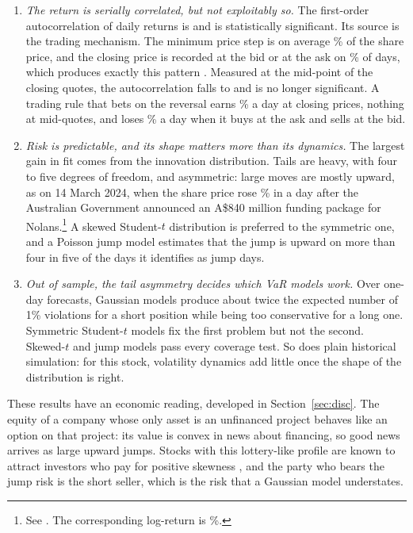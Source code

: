 \documentclass[11pt,a4paper]{article}
\begin{document}
\begin{enumerate}[leftmargin=1.4em]
\item \emph{The return is serially correlated, but not exploitably so.} The first-order autocorrelation of daily returns is \rhoOne{} and is statistically significant. Its source is the trading mechanism. The minimum price step is on average \tickMean\% of the share price, and the closing price is recorded at the bid or at the ask on \qAtQuote\% of days, which produces exactly this pattern \citep{roll1984}. Measured at the mid-point of the closing quotes, the autocorrelation falls to \midRho{} and is no longer significant. A trading rule that bets on the reversal earns \conGross\% a day at closing prices, nothing at mid-quotes, and loses \conLoss\% a day when it buys at the ask and sells at the bid.
\item \emph{Risk is predictable, and its shape matters more than its dynamics.} The largest gain in fit comes from the innovation distribution. Tails are heavy, with four to five degrees of freedom, and asymmetric: large moves are mostly upward, as on 14 March 2024, when the share price rose \jumpSimple\% in a day after the Australian Government announced an A\$840 million funding package for Nolans.\footnote{See \citet{miningweekly2024}. The corresponding log-return is \jumpLog\%.} A skewed Student-$t$ distribution \citep{hansen1994} is preferred to the symmetric one, and a Poisson jump model estimates that the jump is upward on more than four in five of the days it identifies as jump days.
\item \emph{Out of sample, the tail asymmetry decides which VaR models work.} Over \oosN{} one-day forecasts, Gaussian models produce about twice the expected number of 1\% violations for a short position while being too conservative for a long one. Symmetric Student-$t$ models fix the first problem but not the second. Skewed-$t$ and jump models pass every coverage test. So does plain historical simulation: for this stock, volatility dynamics add little once the shape of the distribution is right.
\end{enumerate}

These results have an economic reading, developed in Section~\ref{sec:disc}. The equity of a company whose only asset is an unfinanced project behaves like an option on that project: its value is convex in news about financing, so good news arrives as large upward jumps. Stocks with this lottery-like profile are known to attract investors who pay for positive skewness \citep{barberishuang2008,bali2011}, and the party who bears the jump risk is the short seller, which is the risk that a Gaussian model understates.
\end{document}
